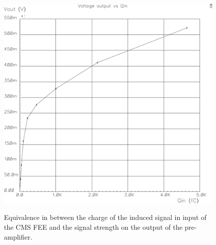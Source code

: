 	\begin{figure}[H]
		\centering
		\includegraphics[width = 0.7\plotwidth]{fig/chapt4/CMS-FEE-preamp.pdf}\\
		\caption{\label{fig:CMS-FEE-preamp} Equivalence in between the charge of the induced signal in input of the CMS FEE and the signal strength on the output of the pre-amplifier.}
	\end{figure}
	

